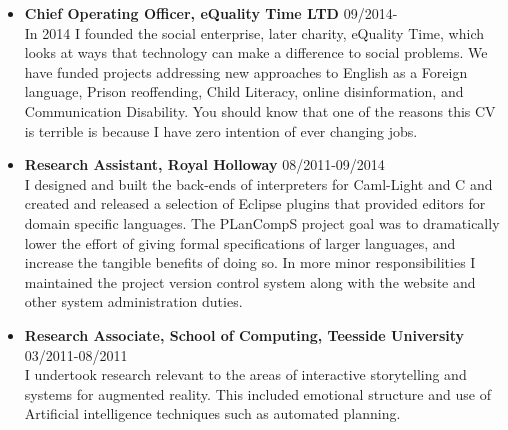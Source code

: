 \documentclass[10pt]{article}
\newenvironment{outerlist}[1][\enskip\textbullet]%
        {\begin{itemize}[#1]}{\end{itemize}%
         \vspace{-.6\baselineskip}}
\begin{document}
\vspace{-0.75cm}
\begin{outerlist}



\item[] {\bf Chief Operating Officer, eQuality Time LTD} \hfill 09/2014- \\
In 2014 I founded the social enterprise, later charity, eQuality Time, which  looks at ways that technology can make a difference to social problems. We have funded projects addressing new approaches to English as a Foreign language, Prison reoffending, Child Literacy, online disinformation, and Communication Disability.  You should know that one of the reasons this CV is terrible is because I have zero intention of ever changing jobs. 


\item[] {\bf Research Assistant, Royal Holloway} \hfill 08/2011-09/2014 \\
I designed and built the back-ends of interpreters for Caml-Light and C and created and released a selection of Eclipse plugins that provided editors for domain specific languages.  The PLanCompS project goal was to dramatically lower the effort of giving formal specifications of larger languages, and increase the tangible benefits of doing so. In more minor responsibilities I maintained the project version control system along with the website and other system administration duties.  

\item[] {\bf  Research Associate, School of Computing, Teesside University} \hfill 03/2011-08/2011 \\
I undertook research relevant to the areas of interactive storytelling and systems for augmented reality. This included emotional structure and use of Artificial intelligence techniques such as automated planning.


\end{outerlist}
\end{document}
